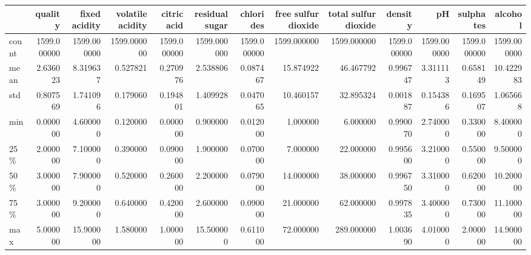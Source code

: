 \begin{tabular}{lrrrrrrrrrrrr}
\toprule
{} &      quality &  fixed acidity &  volatile acidity &  citric acid &  residual sugar &    chlorides &  free sulfur dioxide &  total sulfur dioxide &      density &           pH &    sulphates &      alcohol \\
\midrule
count &  1599.000000 &    1599.000000 &       1599.000000 &  1599.000000 &     1599.000000 &  1599.000000 &          1599.000000 &           1599.000000 &  1599.000000 &  1599.000000 &  1599.000000 &  1599.000000 \\
mean  &     2.636023 &       8.319637 &          0.527821 &     0.270976 &        2.538806 &     0.087467 &            15.874922 &             46.467792 &     0.996747 &     3.311113 &     0.658149 &    10.422983 \\
std   &     0.807569 &       1.741096 &          0.179060 &     0.194801 &        1.409928 &     0.047065 &            10.460157 &             32.895324 &     0.001887 &     0.154386 &     0.169507 &     1.065668 \\
min   &     0.000000 &       4.600000 &          0.120000 &     0.000000 &        0.900000 &     0.012000 &             1.000000 &              6.000000 &     0.990070 &     2.740000 &     0.330000 &     8.400000 \\
25\%   &     2.000000 &       7.100000 &          0.390000 &     0.090000 &        1.900000 &     0.070000 &             7.000000 &             22.000000 &     0.995600 &     3.210000 &     0.550000 &     9.500000 \\
50\%   &     3.000000 &       7.900000 &          0.520000 &     0.260000 &        2.200000 &     0.079000 &            14.000000 &             38.000000 &     0.996750 &     3.310000 &     0.620000 &    10.200000 \\
75\%   &     3.000000 &       9.200000 &          0.640000 &     0.420000 &        2.600000 &     0.090000 &            21.000000 &             62.000000 &     0.997835 &     3.400000 &     0.730000 &    11.100000 \\
max   &     5.000000 &      15.900000 &          1.580000 &     1.000000 &       15.500000 &     0.611000 &            72.000000 &            289.000000 &     1.003690 &     4.010000 &     2.000000 &    14.900000 \\
\bottomrule
\end{tabular}

